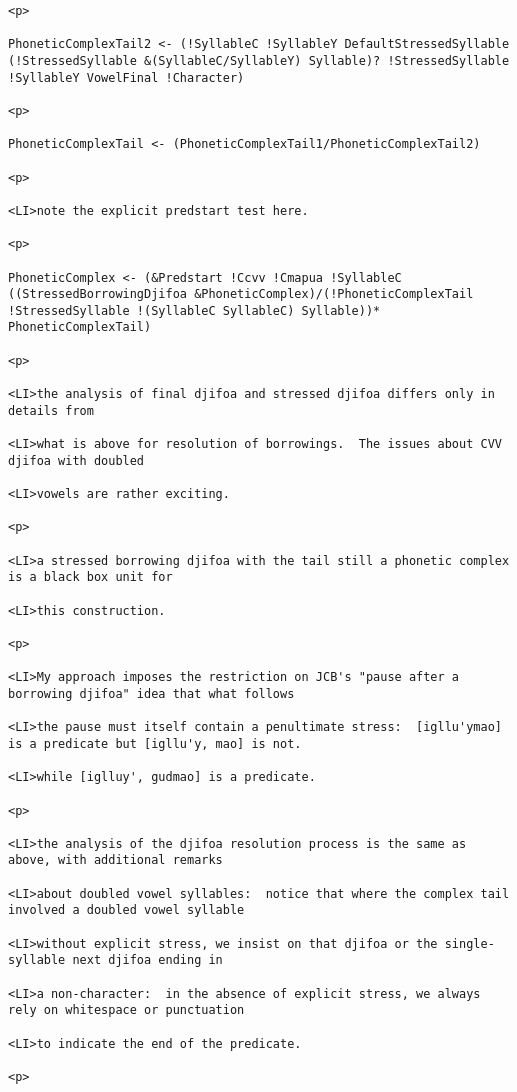 \documentclass[12pt]{article}
\begin{document}
\begin{lstlisting}
<p>

PhoneticComplexTail2 <- (!SyllableC !SyllableY DefaultStressedSyllable (!StressedSyllable &(SyllableC/SyllableY) Syllable)? !StressedSyllable !SyllableY VowelFinal !Character)

<p>

PhoneticComplexTail <- (PhoneticComplexTail1/PhoneticComplexTail2)

<p>

<LI>note the explicit predstart test here.

<p>

PhoneticComplex <- (&Predstart !Ccvv !Cmapua !SyllableC ((StressedBorrowingDjifoa &PhoneticComplex)/(!PhoneticComplexTail !StressedSyllable !(SyllableC SyllableC) Syllable))* PhoneticComplexTail)

<p>

<LI>the analysis of final djifoa and stressed djifoa differs only in details from

<LI>what is above for resolution of borrowings.  The issues about CVV djifoa with doubled

<LI>vowels are rather exciting.

<p>

<LI>a stressed borrowing djifoa with the tail still a phonetic complex is a black box unit for

<LI>this construction.

<p>

<LI>My approach imposes the restriction on JCB's "pause after a borrowing djifoa" idea that what follows

<LI>the pause must itself contain a penultimate stress:  [igllu'ymao] is a predicate but [igllu'y, mao] is not.

<LI>while [iglluy', gudmao] is a predicate.

<p>

<LI>the analysis of the djifoa resolution process is the same as above, with additional remarks

<LI>about doubled vowel syllables:  notice that where the complex tail involved a doubled vowel syllable

<LI>without explicit stress, we insist on that djifoa or the single-syllable next djifoa ending in

<LI>a non-character:  in the absence of explicit stress, we always rely on whitespace or punctuation

<LI>to indicate the end of the predicate.

<p>


\end{lstlisting}
\end{document}
